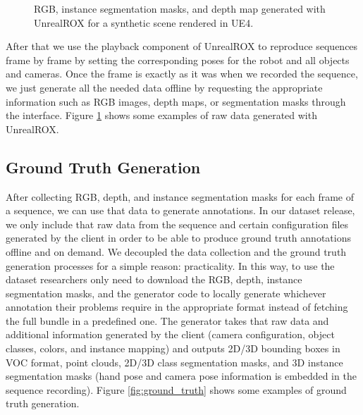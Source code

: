 \begin{figure}[!hbt]
  \centering
  \smallskip
  \caption{RGB, instance segmentation masks, and depth map generated with UnrealROX for a synthetic scene rendered in \acf{UE4}.}
  \label{fig:unrealcv_overview}
\end{figure}

After that we use the playback component of UnrealROX to reproduce sequences frame by frame by setting the corresponding poses for the robot and all objects and cameras. Once the frame is exactly as it was when we recorded the sequence, we just generate all the needed data offline by requesting the appropriate information such as RGB images, depth maps, or segmentation masks through the interface. Figure \ref{fig:unrealcv_overview} shows some examples of raw data generated with UnrealROX.

\subsection{Ground Truth Generation}

After collecting RGB, depth, and instance segmentation masks for each frame of a sequence, we can use that data to generate annotations. In our dataset release, we only include that raw data from the sequence and certain configuration files generated by the client in order to be able to produce ground truth annotations offline and on demand. We decoupled the data collection and the ground truth generation processes for a simple reason: practicality. In this way, to use the dataset researchers only need to download the RGB, depth, instance segmentation masks, and the generator code to locally generate whichever annotation their problems require in the appropriate format instead of fetching the full bundle in a predefined one. The generator takes that raw data and additional information generated by the client (camera configuration, object classes, colors, and instance mapping) and outputs 2D/3D bounding boxes in VOC format, point clouds, 2D/3D class segmentation masks, and 3D instance segmentation masks (hand pose and camera pose information is embedded in the sequence recording). Figure \ref{fig:ground_truth} shows some examples of ground truth generation.

